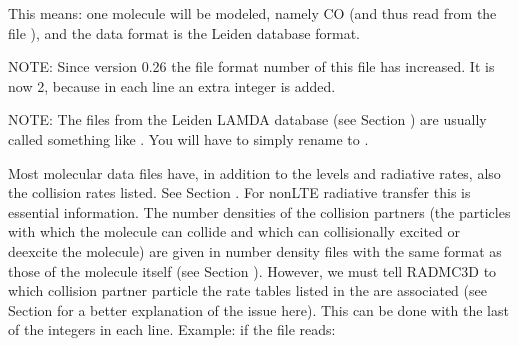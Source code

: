 \documentclass[letterpaper,10pt,english]{sphinxmanual}
\begin{document}
\begin{sphinxVerbatim}[commandchars=\\\{\}]
            
\end{sphinxVerbatim}

This means: one molecule will be modeled, namely CO (and thus read from the file
), and the data format is the Leiden database format.

NOTE: Since version 0.26 the file format number of this file 
has increased. It is now 2, because in each line an extra integer is added.

NOTE: The files from the Leiden LAMDA database (see Section
{\hyperref[\detokenize{lineradtrans:sec-leiden-format}]{}}) are usually called something like . You will
have to simply rename to .

Most molecular data files have, in addition to the levels and radiative
rates, also the collision rates listed. See Section {\hyperref[\detokenize{lineradtrans:sec-leiden-format}]{}}.
For non\sphinxhyphen{}LTE radiative transfer this is essential information. The number
densities of the collision partners (the particles with which the molecule
can collide and which can collisionally excited or de\sphinxhyphen{}excite the molecule)
are given in number density files with the same format as those of the
molecule itself (see Section {\hyperref[\detokenize{lineradtrans:sec-collpartner}]{}}). However, we must tell
RADMC\sphinxhyphen{}3D to which collision partner particle the rate tables listed in the
 are associated (see Section
{\hyperref[\detokenize{lineradtrans:sec-collpartner}]{}} for a better explanation of the issue here). This can
be done with the last of the integers in each line. Example: if the
 file reads:

\begin{sphinxVerbatim}[commandchars=\\\{\}]
            
\end{sphinxVerbatim}
\end{document}
